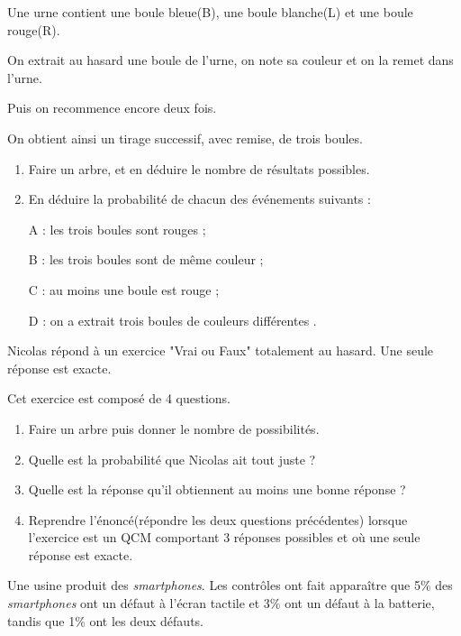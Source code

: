 \medskip

\exo

Une urne contient une boule bleue(B), une boule blanche(L) et une boule rouge(R).

On extrait au hasard une boule de l'urne, on note sa couleur et on la remet dans l'urne.

Puis on recommence encore deux fois.

On obtient ainsi un tirage successif, avec remise, de trois boules.

\begin{enumerate}
\item Faire un arbre, et en déduire le nombre de résultats possibles.
\item  En déduire la probabilité de chacun des événements suivants :

A : \og les trois boules sont rouges \fg ;

B : \og les trois boules sont de même couleur \fg{};

C : \og au moins une boule est rouge \fg{} ;

D : \og on a extrait trois boules de couleurs différentes \fg{}.

\end{enumerate}

\medskip

\exo

Nicolas répond à un exercice "Vrai ou Faux" totalement au hasard. 
Une seule réponse est exacte.

Cet exercice est composé de 4 questions.

\begin{enumerate}
\item Faire un arbre puis donner le nombre de possibilités.
\item Quelle est la probabilité que Nicolas ait tout juste ?
\item Quelle est la réponse qu'il obtiennent au moins une bonne réponse ?

\item Reprendre l'énoncé(répondre les deux questions précédentes) lorsque l'exercice est un QCM comportant 3 réponses possibles et où une seule réponse est exacte.
\end{enumerate}

\exo

Une usine produit des \emph{smartphones}. Les contrôles ont fait apparaître que 5\% des \emph{smartphones} ont un défaut à l'écran tactile et 3\% ont un défaut à la batterie, tandis que 1\% ont les deux défauts.

